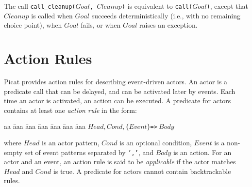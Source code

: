 The call \texttt{call\_cleanup($Goal$, $Cleanup$)} is equivalent to {\tt call($Goal$)}, except that \texttt{$Cleanup$} is called when \texttt{$Goal$} succeeds deterministically (i.e., with no remaining choice point), when \texttt{$Goal$} fails, or when \texttt{$Goal$} raises an exception.


\section{Action Rules}
Picat provides action rules for describing event-driven actors. An actor is a predicate call that can be delayed, and can be activated later by events. Each time an actor is activated, an action can be executed. A predicate for actors contains at least one \emph{action rule} in the form:
\begin{tabbing}
aa \= aaa \= aaa \= aaa \= aaa \= aaa \= aaa \kill
\> $Head, Cond, \{Event\} $\verb+=>+$\ Body$ 
\end{tabbing}
where $Head$ is an actor pattern, $Cond$ is an optional condition, $Event$ is a non-empty set of event patterns separated by \texttt{','},  and $Body$ is an action. For an actor and an event, an action rule is said to be \emph{applicable} if the actor matches $Head$ and $Cond$ is true. A predicate for actors cannot contain backtrackable rules.

